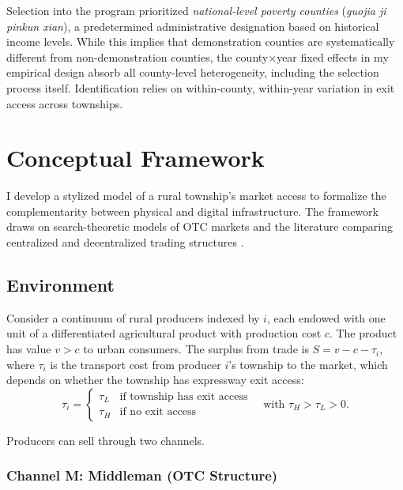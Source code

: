 \documentclass[12pt]{article}
\begin{document}
Selection into the program prioritized \textit{national-level poverty counties} (\textit{guojia ji pinkun xian}), a predetermined administrative designation based on historical income levels. While this implies that demonstration counties are systematically different from non-demonstration counties, the county$\times$year fixed effects in my empirical design absorb all county-level heterogeneity, including the selection process itself. Identification relies on within-county, within-year variation in exit access across townships.


\section{Conceptual Framework}\label{sec:framework}

I develop a stylized model of a rural township's market access to formalize the complementarity between physical and digital infrastructure. The framework draws on search-theoretic models of OTC markets \citep{dgp2005,dgp2007} and the literature comparing centralized and decentralized trading structures \citep{pagano1989,malamud2017,glode2020}.

\subsection{Environment}

Consider a continuum of rural producers indexed by $i$, each endowed with one unit of a differentiated agricultural product with production cost $c$. The product has value $v > c$ to urban consumers. The surplus from trade is $S = v - c - \tau_i$, where $\tau_i$ is the transport cost from producer $i$'s township to the market, which depends on whether the township has expressway exit access:
\begin{equation}
    \tau_i =
    \begin{cases}
        \tau_L & \text{if township has exit access} \\
        \tau_H & \text{if no exit access}
    \end{cases}
    \quad \text{with } \tau_H > \tau_L > 0.
\end{equation}

Producers can sell through two channels.

\subsubsection{Channel M: Middleman (OTC Structure)}
\end{document}
